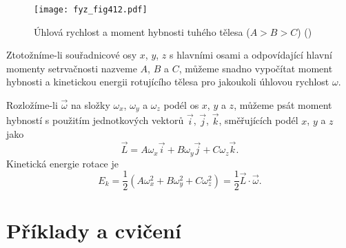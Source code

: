     \begin{figure}[ht!] %
      \centering
      \texttt{[image: fyz\_fig412.pdf]}
      \caption{Úhlová rychlost a moment hybnosti tuhého tělesa (\(A>B>C\))
              (\cite[s.~283]{Feynman01})}
      \label{fyz:fig412}
    \end{figure}

    Ztotožníme-li souřadnicové osy \(x\), \(y\), \(z\) s hlavními osami a odpovídající hlavní
    momenty setrvačnosti nazveme \(A\), \(B\) a \(C\), můžeme snadno vypočítat moment hybnosti a
    kinetickou energii rotujícího tělesa pro jakoukoli úhlovou rychlost \(\omega\).

    Rozložíme-li \(\vec{\omega}\) na složky \(ω_x\), \(ω_y\) a \(ω_z\) podél os \(x\), \(y\) a
    \(z\), můžeme psát moment hybností s použitím jednotkových vektorů \(\vec{i}\), \(\vec{j}\),
    \(\vec{k}\), směřujících podél \(x\), \(y\) a \(z\) jako 
    \begin{equation}\label{fyz:eq725}
      \vec{L}=Aω_x\vec{i}+Bω_y\vec{j}+Cω_z\vec{k}.
    \end{equation}
    Kinetická energie rotace je
    \begin{equation}\label{fyz:eq726}
      E_k=\frac{1}{2}(Aω^2_x+Bω^2_y+Cω^2_z) =\frac{1}{2}\vec{L}\cdot\vec{ω}. 
    \end{equation}

  \section{Příklady a cvičení}\label{fyz:IchapXXsecV}  

